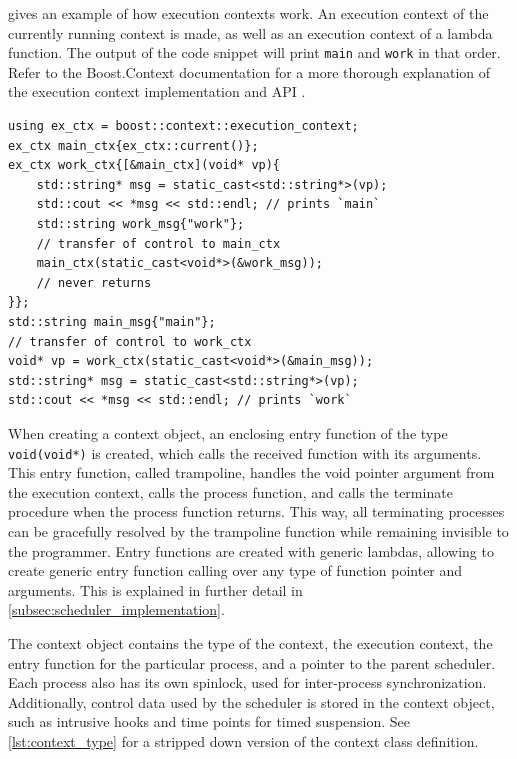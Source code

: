  gives an example of how execution contexts work. An execution context of the currently running context is made, as well as an execution context of a lambda function. The output of the code snippet will print \texttt{main} and \texttt{work} in that order. Refer to the Boost.Context documentation for a more thorough explanation of the execution context implementation and API \citep{kowalke2017boost}.

\begin{lstfloat}
\begin{lstlisting}[caption={Transfer of control between execution contexts.}, label={lst:transfer_control_execution_contexts}, style={CustomC++}, xleftmargin={2em}]
using ex_ctx = boost::context::execution_context;
ex_ctx main_ctx{ex_ctx::current()};
ex_ctx work_ctx{[&main_ctx](void* vp){
    std::string* msg = static_cast<std::string*>(vp);
    std::cout << *msg << std::endl; // prints `main`
    std::string work_msg{"work"};
    // transfer of control to main_ctx
    main_ctx(static_cast<void*>(&work_msg));
    // never returns
}};
std::string main_msg{"main"};
// transfer of control to work_ctx
void* vp = work_ctx(static_cast<void*>(&main_msg));
std::string* msg = static_cast<std::string*>(vp);
std::cout << *msg << std::endl; // prints `work`
\end{lstlisting}
\end{lstfloat}

When creating a context object, an enclosing entry function of the type \lstinline[style={CustomC++}]|void(void*)| is created, which calls the received function with its arguments. This entry function, called trampoline, handles the void pointer argument from the execution context, calls the process function, and calls the terminate procedure when the process function returns. This way, all terminating processes can be gracefully resolved by the trampoline function while remaining invisible to the programmer. Entry functions are created with generic lambdas, allowing to create generic entry function calling over any type of function pointer and arguments. This is explained in further detail in \cref{subsec:scheduler_implementation}.

The context object contains the type of the context, the execution context, the entry function for the particular process, and a pointer to the parent scheduler. Each process also has its own spinlock, used for inter\hyp{}process synchronization. Additionally, control data used by the scheduler is stored in the context object, such as intrusive hooks and time points for timed suspension. See \cref{lst:context_type} for a stripped down version of the context class definition.


